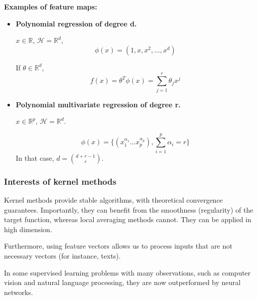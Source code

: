 \documentclass[
10pt, %
a4paper, %
oneside, %
headinclude,footinclude, %
BCOR5mm, %
]{scrartcl}
\begin{document}
\textbf{{Examples of feature maps:}} 

\begin{itemize}
    \item \textbf{{Polynomial regression of degree d.}}

	$x\in \mathbb{R}$, $ \mathcal{H}  = \mathbb{R}^d$, 
	\begin{equation}
	    \phi(x) = (1, x, x^2, \dots, x^d)
	\end{equation}

	If $\theta\in \mathbb{R}^d$, 
	\begin{equation*}
	    f(x) = \theta^T\phi(x) = \sum^{r}_{j=1} \theta_jx^j
	\end{equation*}
    \item \textbf{{Polynomial multivariate regression of degree r.}}

	$x\in \mathbb{R}^p$, $ \mathcal{H}  = \mathbb{R}^d$.

	\begin{equation*}
	    \phi(x) = \{(x_1^{\alpha_1}\dots x_p^{\alpha_p}),{ \sum^{p}_{i=1} \alpha_i = r}\}
	\end{equation*}
	In that case, $d = \binom{d+r-1}{r}$.


\end{itemize}

\subsubsection{\large\color{Periwinkle}Interests of kernel methods}

Kernel methods provide stable algorithms, with theoretical convergence guarantees. Importantly, they can benefit from the smoothness (regularity) of the target function, whereas local averaging methods cannot. They can be applied in high dimension.

Furthermore, using feature vectors allows us to process inputs that are not necessary vectors (for instance, texts).

In some supervised learning problems with many observations, such as computer vision and natural language processing, they are now outperformed by neural networks.
\end{document}
